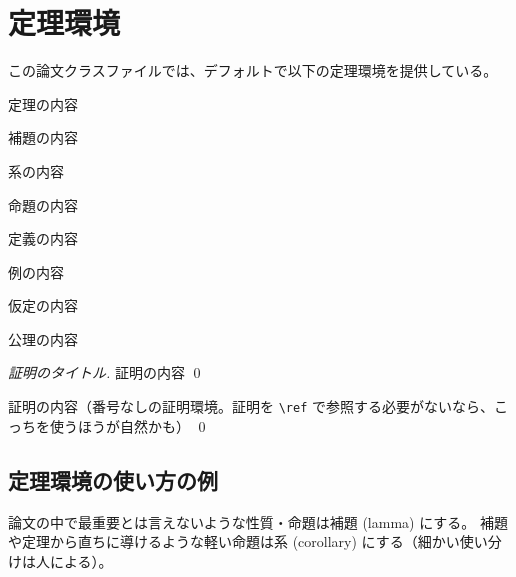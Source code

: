 \documentclass{sumiilab-paper}
\begin{document}
\section{定理環境}

この論文クラスファイルでは、デフォルトで以下の定理環境を提供している。

\begin{theorem}[定理のタイトル]
  定理の内容
\end{theorem}

\begin{lemma}[補題のタイトル]
  補題の内容
\end{lemma}

\begin{corollary}[系のタイトル]
  系の内容
\end{corollary}

\begin{proposition}[命題のタイトル]
  命題の内容
\end{proposition}

\begin{definition}[定義のタイトル]
  定義の内容
\end{definition}

\begin{example}[例のタイトル]
  例の内容
\end{example}

\begin{assumption}[仮定のタイトル]
  仮定の内容
\end{assumption}

\begin{axiom}[公理のタイトル]
  公理の内容
\end{axiom}

\begin{proof}[証明のタイトル]
  証明の内容 \qed
\end{proof}

\begin{proof*}[証明のタイトル]
  証明の内容（番号なしの証明環境。証明を \lstinline|\ref| で参照する必要がないなら、こっちを使うほうが自然かも） \qed
\end{proof*}

\subsection{定理環境の使い方の例}

\begin{lemma}
  \label{lem:interesting-lemma}
  論文の中で最重要とは言えないような性質・命題は補題 (lamma) にする。
  補題や定理から直ちに導けるような軽い命題は系 (corollary) にする（細かい使い分けは人による）。
\end{lemma}
\end{document}
